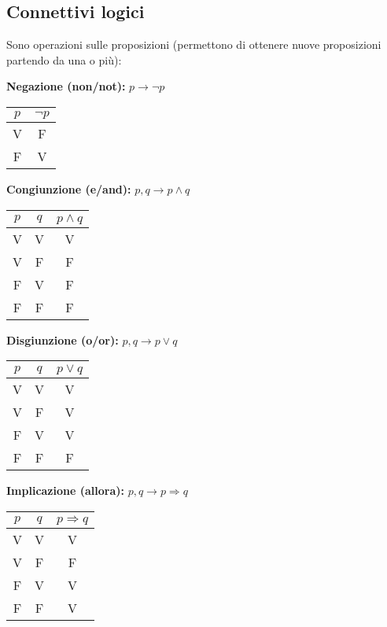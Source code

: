 \documentclass[10pt]{article}
\theoremstyle{plain}
\begin{document}
\subsection{Connettivi logici}
Sono operazioni sulle proposizioni (permettono di ottenere nuove proposizioni partendo da una o più):
\begin{description}
   \item[$\ast$] \textbf{Negazione (non/not):} $p \longrightarrow \neg p$ 
   \item \begin{center} \begin{tabular}{c|c}
        $p$ & $\neg p$  \\
        \hline  V  & F \\ F & V
       \end{tabular} \end{center}
     \item[$\ast$] \textbf{Congiunzione (e/and):} $p, q \longrightarrow p \land q$
   \item \begin{center} \begin{tabular}{c|c|c}
        $p$ & $q$ & $p \land q$  \\
        \hline  V  & V & V \\ V & F & F \\ F & V & F \\ F & F & F 
       \end{tabular}
       \end{center}
 \item[$\ast$] \textbf{Disgiunzione (o/or):} $p, q \longrightarrow p \lor q$
   \item \begin{center} \begin{tabular}{c|c|c}
        $p$ & $q$ & $p \lor q$  \\
        \hline  V  & V & V \\ V & F & V \\ F & V & V \\ F & F & F
       \end{tabular}  \end{center}
 \item[$\ast$] \textbf{Implicazione (allora):} $p, q \longrightarrow p \Rightarrow q$
   \item \begin{center} \begin{tabular}{c|c|c}
        $p$ & $q$ & $p \Rightarrow q$  \\
        \hline  V  & V & V \\ V & F & F \\ F & V & V \\ F & F & V

\end{tabular}
\end{center}
\end{description}
\end{document}
